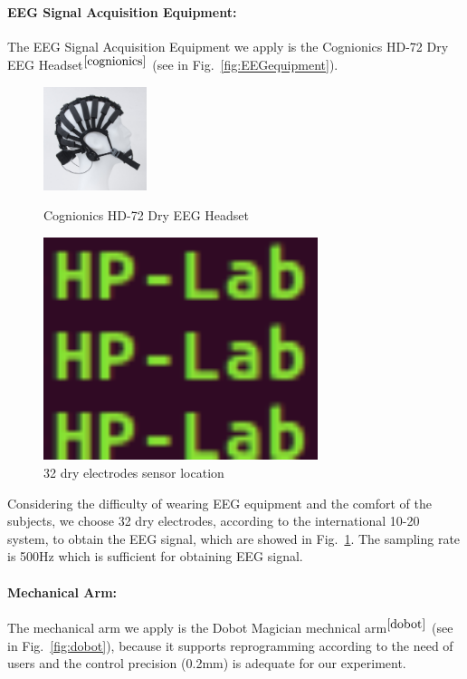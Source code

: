 \documentclass[runningheads,a4paper]{llncs}
\begin{document}
\paragraph{EEG Signal Acquisition Equipment:}
The EEG Signal Acquisition Equipment we apply is the Cognionics HD-72 Dry EEG
Headset$^{\cite{cognionics}}$ (see in Fig.~\ref{fig:EEGequipment}).
\begin{figure}
     \centering
     \includegraphics[height=3cm]{images/1}
     \caption{Cognionics HD-72 Dry EEG Headset}
     \label{fig:EEGequipment}
     \centering
     \includegraphics[height=6.5cm]{images/2}
     \caption{32 dry electrodes sensor location}
     \label{fig:sensorloc}
\end{figure}

Considering the difficulty of wearing EEG equipment and the comfort of the subjects,
we choose 32 dry electrodes, according to the international 10-20 system,
to obtain the EEG signal, which are showed in Fig.~\ref{fig:sensorloc}. The
sampling rate is 500Hz which is sufficient for obtaining EEG signal.

\paragraph{Mechanical Arm:}
The mechanical arm we apply is the Dobot Magician mechnical arm$^{\cite{dobot}}$
(see in Fig.~\ref{fig:dobot}), because it supports reprogramming according to
the need of users and the control precision (0.2mm) is adequate for our experiment.
\end{document}
